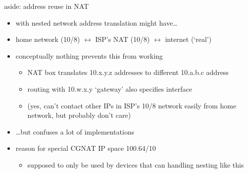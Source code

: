 \begin{frame}{aside: address reuse in NAT}
    \begin{itemize}
    \item with nested network address translation might have\ldots
    \item home network (10/8) $\leftrightarrow$ ISP's NAT (10/8) $\leftrightarrow$ internet (`real')
    \vspace{.5cm}
    \item conceptually nothing prevents this from working
        \begin{itemize}
        \item NAT box translates 10.x.y.z addresses to different 10.a.b.c address
        \item routing with 10.w.x.y `gateway' also specifies interface
        \item (yes, can't contact other IPs in ISP's 10/8 network easily from home network, but probably don't care)
        \end{itemize}
    \item \ldots but confuses a lot of implementations
    \item reason for special CGNAT IP space 100.64/10
        \begin{itemize}
        \item supposed to only be used by devices that can handling nesting like this
        \end{itemize}
    \end{itemize}
\end{frame}
